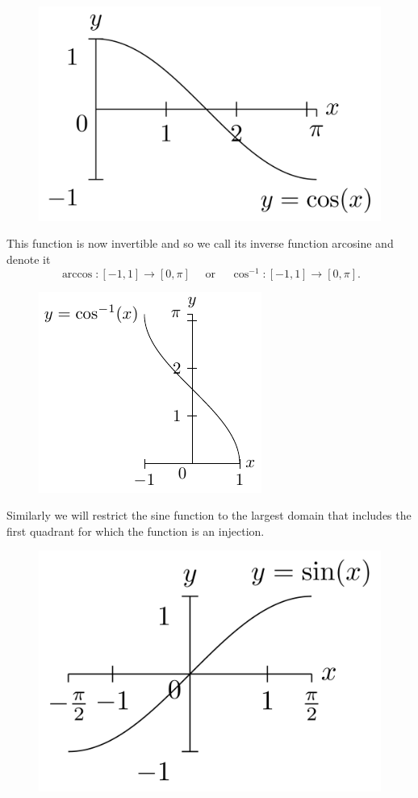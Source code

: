 \documentclass[
]{book}
\theoremstyle{definition}
\theoremstyle{definition}
\theoremstyle{definition}
\theoremstyle{definition}
\theoremstyle{remark}
\begin{document}
\begin{figure}

{\centering \includegraphics[width=0.4\linewidth]{tikz/cosine-graph-restricted} 

}

\end{figure}

This function is now invertible and so we call its inverse function arcosine and denote it
\[\arccos:[-1,1]\rightarrow [0,\pi] \quad \mbox{ or } \quad  \cos^{-1}:[-1,1]\rightarrow [0,\pi].\]

\begin{figure}

{\centering \includegraphics[width=0.4\linewidth]{tikz/arccos} 

}

\end{figure}

Similarly we will restrict the sine function to the largest domain that includes the first quadrant for which the function is an injection.

\begin{figure}

{\centering \includegraphics[width=0.4\linewidth]{tikz/sine-graph-restricted} 

}

\end{figure}
\end{document}
